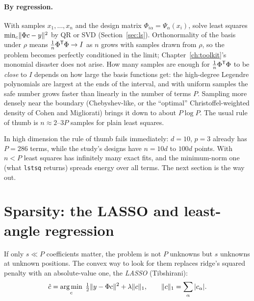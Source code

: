 \paragraph{By regression.} With samples $x_1,\dots,x_n$ and the design matrix $\Phi_{i\alpha} = \Psi_\alpha(x_i)$,
solve least squares $\min_c \lVert \Phi c - y\rVert^2$ by QR or SVD (Section~\ref{sec:ls}). Orthonormality of the basis
under $\rho$ means $\tfrac1n\Phi^{\mathsf{T}}\Phi \to I$ as $n$ grows with samples drawn from $\rho$, so the problem becomes
perfectly conditioned in the limit; Chapter~\ref{ch:toolkit}'s monomial disaster does not arise. How many samples are
enough for $\tfrac1n\Phi^{\mathsf{T}}\Phi$ to be \emph{close} to $I$ depends on how large the basis functions get: the high-degree
Legendre polynomials are largest at the ends of the interval, and with uniform samples the safe number grows faster
than linearly in the number of terms $P$. Sampling more densely near the boundary (Chebyshev-like, or the ``optimal''
Christoffel-weighted density of Cohen and Migliorati) brings it down to about $P\log P$. The usual rule of thumb is
$n \approx 2$--$3P$ samples for plain least squares.

\begin{pitfall}
In high dimension the rule of thumb fails immediately: $d = 10$, $p = 3$ already has $P = 286$ terms, while the
study's designs have $n = 10d$ to $100d$ points. With $n < P$ least squares has infinitely many exact fits, and the
minimum-norm one (what \texttt{lstsq} returns) spreads energy over all terms. The next section is the way out.
\end{pitfall}

\section{Sparsity: the LASSO and least-angle regression}
\label{sec:sparse}

If only $s \ll P$ coefficients matter, the problem is not $P$ unknowns but $s$ unknowns at unknown positions. The
convex way to look for them replaces ridge's squared penalty with an absolute-value one, the \emph{LASSO}
(Tibshirani):
\begin{equation}
  \hat c = \operatorname*{arg\,min}_c \; \tfrac12\lVert y - \Phi c\rVert^2 + \lambda \lVert c\rVert_1, \qquad \lVert c\rVert_1 = \sum_\alpha |c_\alpha| .
  \label{eq:lasso}
\end{equation}

